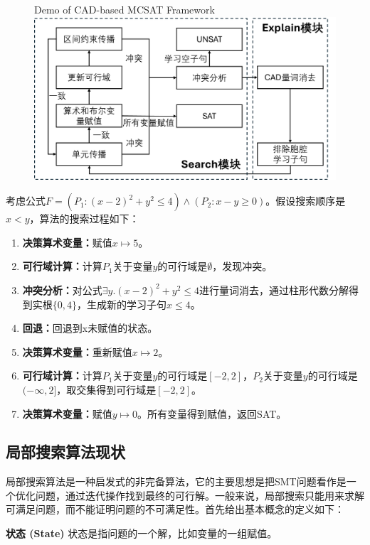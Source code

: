 \begin{figure}[t]
    \centering
     {Demo of CAD-based MCSAT Framework}
    \includegraphics[width=0.6\columnwidth]{Img/mcsat.png}
    \label{fig:mcsat}
\end{figure}


\begin{example}
考虑公式$F=(P_1: (x-2)^2 + y^2 \le 4) \wedge (P_2: x - y \ge 0)$。假设搜索顺序是$x < y$，算法的搜索过程如下：
\begin{enumerate}
    \item \textbf{决策算术变量：}赋值$x \mapsto 5$。
    \item \textbf{可行域计算：}计算$P_1$关于变量$y$的可行域是$\emptyset$，发现冲突。
    \item \textbf{冲突分析：}对公式$\exists y. (x-2)^2 + y^2 \le 4$进行量词消去，通过柱形代数分解得到实根$\{0, 4\}$，生成新的学习子句$x \le 4$。
    \item \textbf{回退：}回退到x未赋值的状态。
    \item \textbf{决策算术变量：}重新赋值$x \mapsto 2$。
    \item \textbf{可行域计算：}计算$P_1$关于变量$y$的可行域是$[-2, 2]$，$P_2$关于变量$y$的可行域是$(-\infty, 2]$，取交集得到可行域是$[-2, 2]$。
    \item \textbf{决策算术变量：}赋值$y \mapsto 0$。所有变量得到赋值，返回SAT。
\end{enumerate}
\label{ex:nlsat}
\end{example}

\subsection{局部搜索算法现状}
局部搜索算法是一种启发式的非完备算法，它的主要思想是把SMT问题看作是一个优化问题，通过迭代操作找到最终的可行解。一般来说，局部搜索只能用来求解可满足问题，而不能证明问题的不可满足性。首先给出基本概念的定义如下：

\begin{definition}{\textbf{状态 (State)}}
状态是指问题的一个解，比如变量的一组赋值。
\end{definition}

